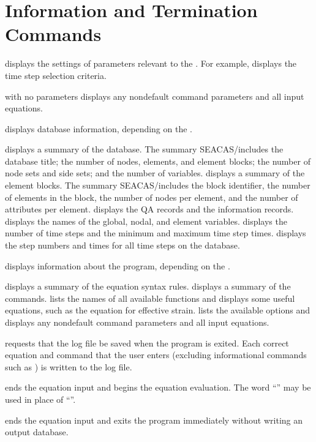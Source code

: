 \newpage
\section{Information and Termination Commands} \label{cmd:infoterm}

 {
 displays the settings of parameters relevant to the
. For example,  displays the time step
selection criteria.

 with no parameters displays any nondefault command parameters
and all input equations.
}

 {
 displays database information, depending on the
.

 {
displays a summary of the database. The summary SEACAS/includes the database
title; the number of nodes, elements, and element blocks; the number of
node sets and side sets; and the number of variables.
}
 {
displays a summary of the element blocks. The summary SEACAS/includes the block
identifier, the number of elements in the block, the number of nodes per
element, and the number of attributes per element.
}
 {
displays the QA records and the information records.
}
 {
displays the names of the global, nodal, and element variables.
}
 {
displays the number of time steps and the minimum and maximum time step
times.
}
 {
displays the step numbers and times for all time steps on the database.
}
}

\newpage %
 {
 displays information about the \caps{\PROGRAM} program,
depending on the .

 {
displays a summary of the equation syntax rules.
}
 {
displays a summary of the commands.
}
 {
lists the names of all available functions and displays some useful
equations, such as the equation for effective strain.
}
 {
lists the available  options and displays any nondefault
command parameters and all input equations.
}
}

 {
 requests that the log file be saved when the program is
exited. Each correct equation and command that the user enters
(excluding informational commands such as ) is written to the
log file.
}

 {
 ends the equation input and begins the equation evaluation.
The word ``'' may be used in place of ``''.
}

 {
 ends the equation input and exits the program immediately
without writing an output database.
}
